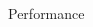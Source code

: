 \documentclass[unknownkeysallowed,final]{beamer}
\begin{document}
\begin{frame}{}
\begin{textblock}{17.3}
\begin{block}{\small{Performance}}
%

\end{block}
\end{textblock}
\end{frame}
\end{document}
